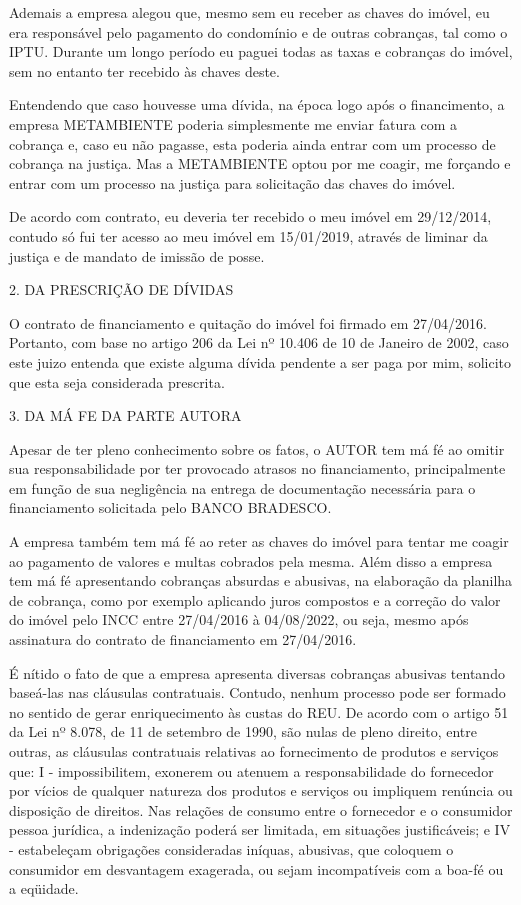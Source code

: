 \documentclass[11pt]{letter}
\begin{document}
Ademais a empresa alegou que, mesmo sem eu receber as chaves do imóvel, eu era responsável pelo pagamento do condomínio e de outras cobranças, tal como o IPTU. Durante um longo período eu paguei todas as taxas e cobranças do imóvel, sem no entanto ter recebido às chaves deste.

Entendendo que caso houvesse uma dívida, na época logo após o financimento, a empresa METAMBIENTE poderia simplesmente me enviar fatura com a cobrança e, caso eu não pagasse, esta poderia ainda entrar com um processo de cobrança na justiça. Mas a METAMBIENTE optou por me coagir, me forçando e entrar com um processo na justiça para solicitação das chaves do imóvel.

De acordo com contrato, eu deveria ter recebido o meu imóvel em 29/12/2014, contudo só fui ter acesso ao meu imóvel em 15/01/2019, através de liminar da justiça e de mandato de imissão de posse. 

2. DA PRESCRIÇÃO DE DÍVIDAS

O contrato de financiamento e quitação do imóvel foi firmado em 27/04/2016. Portanto, com base no artigo 206 da Lei nº 10.406 de 10 de Janeiro de 2002, caso este juizo entenda que existe alguma dívida pendente a ser paga por mim, solicito que esta seja considerada prescrita.

3. DA MÁ FE DA PARTE AUTORA

Apesar de ter pleno conhecimento sobre os fatos, o AUTOR tem má fé ao omitir sua responsabilidade por ter provocado atrasos no financiamento, principalmente em função de sua negligência na entrega de documentação necessária para o financiamento solicitada pelo BANCO BRADESCO.

A empresa também tem má fé ao reter as chaves do imóvel para tentar me coagir ao pagamento de valores e multas cobrados pela mesma. Além disso a empresa tem má fé apresentando cobranças absurdas e abusivas, na elaboração da planilha de cobrança, como por exemplo aplicando juros compostos e a correção do valor do imóvel pelo INCC entre 27/04/2016 à 04/08/2022, ou seja, mesmo após assinatura do contrato de financiamento em 27/04/2016.

É nítido o fato de que a empresa apresenta diversas cobranças abusivas tentando baseá-las nas cláusulas contratuais. Contudo, nenhum processo pode ser formado no sentido de gerar enriquecimento às custas do REU. De acordo com o artigo 51 da Lei nº 8.078, de 11 de setembro de 1990, são nulas de pleno direito, entre outras, as cláusulas contratuais relativas ao fornecimento de produtos e serviços que: I - impossibilitem, exonerem ou atenuem a responsabilidade do fornecedor por vícios de qualquer natureza dos produtos e serviços ou impliquem renúncia ou disposição de direitos. Nas relações de consumo entre o fornecedor e o consumidor pessoa jurídica, a indenização poderá ser limitada, em situações justificáveis; e IV - estabeleçam obrigações consideradas iníquas, abusivas, que coloquem o consumidor em desvantagem exagerada, ou sejam incompatíveis com a boa-fé ou a eqüidade.
\end{document}
